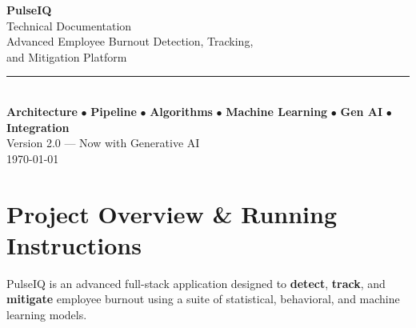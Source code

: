 \documentclass[12pt, a4paper, oneside]{report}
\begin{document}
\begin{titlepage}
    \centering
    \vspace*{2cm}

    {\Huge\bfseries\textcolor{pulsedark}{PulseIQ}}\\[0.5cm]
    {\LARGE\textcolor{pulseblue}{Technical Documentation}}\\[2cm]

    {\large\textcolor{pulsegray}{%
        Advanced Employee Burnout Detection, Tracking,\\
        and Mitigation Platform%
    }}\\[3cm]

    \rule{0.6\textwidth}{0.5pt}\\[1cm]

    {\large
        \textbf{Architecture} $\bullet$
        \textbf{Pipeline} $\bullet$
        \textbf{Algorithms} $\bullet$
        \textbf{Machine Learning} $\bullet$
        \textbf{Gen AI} $\bullet$
        \textbf{Integration}
    }\\[2cm]

    {\large\textcolor{pulsegray}{Version 2.0 --- Now with Generative AI}}\\[0.5cm]
    {\large\textcolor{pulsegray}{\today}}

    \vfill
\end{titlepage}

\tableofcontents
\newpage

\chapter{Project Overview \& Running Instructions}
\label{ch:overview}

PulseIQ is an advanced full-stack application designed to \textbf{detect}, \textbf{track}, and \textbf{mitigate} employee burnout using a suite of statistical, behavioral, and machine learning models.

\end{document}
